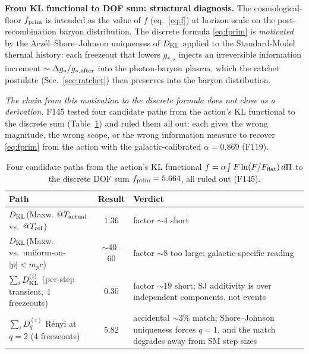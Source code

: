 \documentclass[aps,prd,twocolumn,nofootinbib,floatfix,superscriptaddress]{revtex4-2}
\newcommand{\fprim}{f_{\rm prim}}
\begin{document}
\textbf{From KL functional to DOF sum: structural diagnosis.}
The cosmological-floor $\fprim$ is intended as the value of $f$
(eq.~\ref{eq:f}) at horizon scale on the post-recombination baryon
distribution. The discrete formula \eqref{eq:fprim} is
\emph{motivated} by the Acz\'el--Shore--Johnson uniqueness of
$D_{\rm KL}$ applied to the Standard-Model thermal history: each
freezeout that lowers $g_{*,s}$ injects an irreversible information
increment $\sim \Delta g_{*}/g_{*,{\rm after}}$ into the
photon-baryon plasma, which the ratchet postulate
(Sec.~\ref{sec:ratchet}) then preserves into the baryon distribution.

\emph{The chain from this motivation to the discrete formula does
not close as a derivation.} F145 tested four candidate paths from
the action's KL functional to the discrete sum
(Table~\ref{tab:fprim_paths}) and ruled them all out: each gives
the wrong magnitude, the wrong scope, or the wrong information
measure to recover \eqref{eq:fprim} from the action with the
galactic-calibrated $\alpha=0.869$ (F119).

\begin{table}[h]
\caption{Four candidate paths from the action's KL functional
$f = \alpha\!\int F\ln(F/F_{\rm flat})\,d\Pi$ to the discrete DOF
sum $\fprim = 5.664$, all ruled out (F145).}
\label{tab:fprim_paths}
\begin{ruledtabular}
\begin{tabular}{lcl}
Path & Result & Verdict \\
\hline
$D_{\rm KL}$(Maxw. @$T_{\rm actual}$ vs.\ @$T_{\rm ref}$) & $1.36$ & factor $\sim\!4$ short \\
$D_{\rm KL}$(Maxw. vs.\ uniform-on-$|p|<m_p c$) & ${\sim}40$--$60$ & factor $\sim\!8$ too large; galactic-specific reading \\
$\sum_i D_{\rm KL}^{(i)}$ (per-step transient, 4 freezeouts) & $0.30$ & factor $\sim\!19$ short; SJ additivity is over independent components, not events \\
$\sum_i D_q^{(i)}$ R\'enyi at $q=2$ (4 freezeouts) & $5.82$ & accidental $\sim\!3\%$ match; Shore--Johnson uniqueness forces $q=1$, and the match degrades away from SM step sizes \\
\end{tabular}
\end{ruledtabular}
\end{table}
\end{document}
